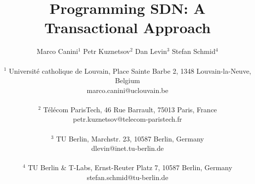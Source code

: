 \documentclass[11pt,pdftex,letter]{article}
\def\SAVESPACE{1}
\begin{document}
\sloppy




\title{Programming SDN: A Transactional Approach}



\author{
	Marco Canini$^{1}$ \quad Petr Kuznetsov$^{2}$ \quad Dan
        Levin$^{3}$ \quad Stefan Schmid$^{4}$\\
\\
        $^{1}$ Universit\'{e} catholique de Louvain, Place Sainte Barbe 2, 1348 Louvain-la-Neuve, Belgium\\
        marco.canini@uclouvain.be\\
\\
        $^{2}$ T\'el\'ecom ParisTech, 46 Rue Barrault, 75013 Paris, France\\
        petr.kuznetsov@telecom-paristech.fr\\
\\
        $^{3}$ TU Berlin, Marchstr. 23, 10587 Berlin, Germany\\
        dlevin@inet.tu-berlin.de\\
\\
        $^{4}$ TU Berlin \& T-Labs, Ernst-Reuter Platz 7, 10587 Berlin, Germany\\
	    stefan.schmid@tu-berlin.de}


\date{}


\maketitle


\thispagestyle{empty}


\end{document}

